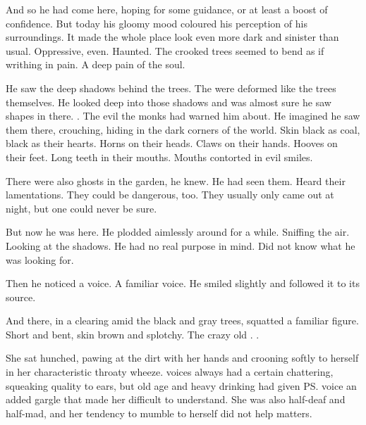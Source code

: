 And so he had come here, hoping for some guidance, or at least a boost of confidence. 
But today his gloomy mood coloured his perception of his surroundings. 
It made the whole place look even more dark and sinister than usual. 
Oppressive, even. 
Haunted. 
The crooked trees seemed to bend as if writhing in pain. 
A deep pain of the soul. 

He saw the deep shadows behind the trees. 
The were deformed like the trees themselves. 
He looked deep into those shadows and was almost sure he saw shapes in there. 
\Qliphoth. 
The evil \qliphoth{} the monks had warned him about. 
He imagined he saw them there, crouching, hiding in the dark corners of the world. 
Skin black as coal, black as their hearts. 
Horns on their heads. 
Claws on their hands. 
Hooves on their feet. 
Long teeth in their mouths. 
Mouths contorted in evil smiles. 

There were also ghosts in the garden, he knew. 
He had seen them. 
Heard their lamentations. 
They could be dangerous, too. 
They usually only came out at night, but one could never be sure. 


But now he was here. 
He plodded aimlessly around for a while. 
Sniffing the air. 
Looking at the shadows. 
He had no real purpose in mind. 
Did not know what he was looking for. 

\begin{comment}
\subsection{The old woman}
\end{comment}

Then he noticed a voice. 
A familiar voice. 
He smiled slightly and followed it to its source. 

And there, in a clearing amid the black and gray trees, squatted a familiar figure. 
Short and bent, skin brown and splotchy. 
The crazy old . 
\Uswa. 

She sat hunched, pawing at the dirt with her hands and crooning softly to herself in her characteristic throaty wheeze. 
\Meccaran{} voices always had a certain chattering, squeaking quality to \human{} ears, but old age and heavy drinking had given \ps{\Uswa}{} voice an added gargle that made her difficult to understand. 
She was also half-deaf and half-mad, and her tendency to mumble to herself did not help matters. 

